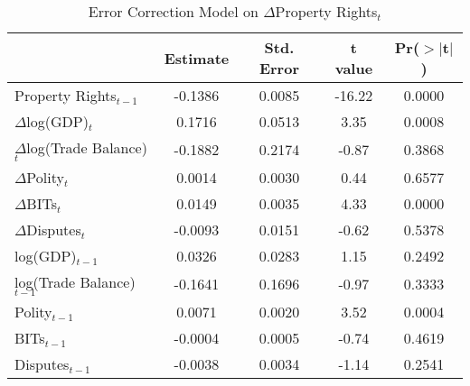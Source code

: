 \begin{table}[ht]
\centering
\label{tab:proprights}
\caption{Error Correction Model on $\Delta$Property Rights$_{t}$}
\begin{tabular}{lcccc}
  \hline\hline
 & Estimate & Std. Error & t value & Pr($>$$|$t$|$) \\ 
  \hline
Property Rights$_{t-1}$ & -0.1386 & 0.0085 & -16.22 & 0.0000 \\ 
\hline
  $\Delta$log(GDP)$_{t}$ & 0.1716 & 0.0513 & 3.35 & 0.0008 \\ 
  $\Delta$log(Trade Balance)$_{t}$ & -0.1882 & 0.2174 & -0.87 & 0.3868 \\ 
  $\Delta$Polity$_{t}$ & 0.0014 & 0.0030 & 0.44 & 0.6577 \\ 
  $\Delta$BITs$_{t}$ & 0.0149 & 0.0035 & 4.33 & 0.0000 \\ 
  $\Delta$Disputes$_{t}$ & -0.0093 & 0.0151 & -0.62 & 0.5378 \\ 
  \hline
  log(GDP)$_{t-1}$ & 0.0326 & 0.0283 & 1.15 & 0.2492 \\ 
  log(Trade Balance)$_{t-1}$ & -0.1641 & 0.1696 & -0.97 & 0.3333 \\ 
  Polity$_{t-1}$ & 0.0071 & 0.0020 & 3.52 & 0.0004 \\ 
  BITs$_{t-1}$ & -0.0004 & 0.0005 & -0.74 & 0.4619 \\ 
  Disputes$_{t-1}$ & -0.0038 & 0.0034 & -1.14 & 0.2541 \\ 
   \hline\hline
\end{tabular}
\end{table}